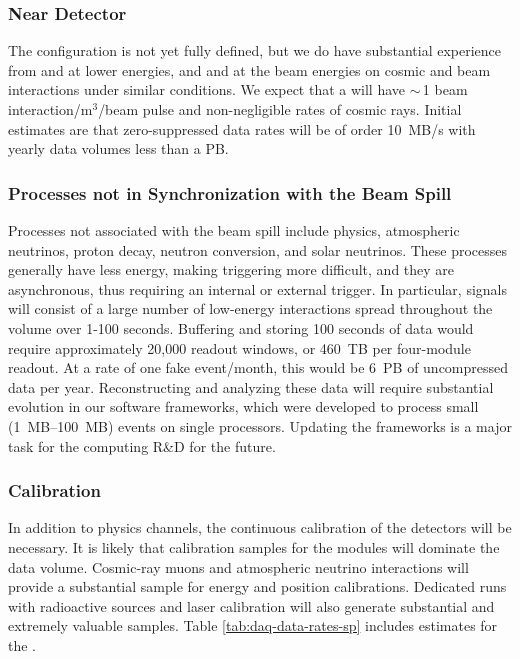 \subsubsection{Near Detector} 
\label{sec:exec-comp-dt-nd}

The  configuration is not yet fully defined,  but we do have substantial experience from  and   at lower energies, and   and  at the   beam energies on cosmic and beam interactions under similar conditions.  We expect that a  will have $\sim\,$1 beam interaction/m$^3$/beam pulse and non-negligible rates of cosmic rays. Initial estimates are that zero-suppressed data rates will be of order \SI{10}{MB/s} with yearly data volumes less than a PB.  

\subsubsection{Processes not in Synchronization with the Beam Spill} 
\label{sec:exec-comp-dt-psbs}

Processes not associated with the beam spill %
include  physics, atmospheric neutrinos, proton decay, neutron conversion, and solar neutrinos.  These processes generally have less energy, making triggering more difficult, and they are  asynchronous, thus requiring an internal or external trigger.  In particular,  signals will consist of a large number of low-energy interactions spread throughout the  volume over 1-100 seconds. Buffering and storing 100 seconds of data would require approximately 20,000 readout windows, or \SI{460}{TB} per four-module  readout.  At a rate of one fake  event/month, this would be \SI{6}{PB} of uncompressed data per year.  Reconstructing and analyzing these data will require substantial evolution in our software frameworks, which were developed to process small (\SIrange{1}{100}{MB}) events on single processors. %
Updating the frameworks is a major task for the  computing R\&D for the future. 

\subsubsection{Calibration}
\label{sec:exec-comp-cal}

In addition to physics channels, the continuous calibration of the detectors will be necessary.  It is likely that calibration samples for the  modules will dominate the data volume. Cosmic-ray muons and atmospheric neutrino interactions will provide a substantial sample for energy and position calibrations.  Dedicated runs with radioactive sources and laser calibration will also generate substantial and extremely valuable samples. Table \ref{tab:daq-data-rates-sp} includes estimates for the %
. 

